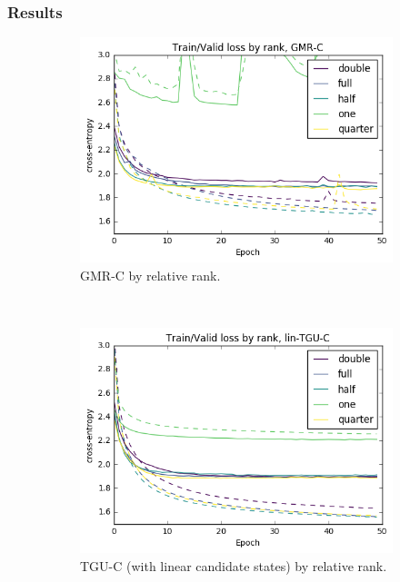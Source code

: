 \subsubsection{Results}
\begin{figure}
\centering
\begin{subfigure}[t]{0.3\textwidth}
	\centering
	\includegraphics[width=\textwidth]{exps/wp/gmr}
	\caption{GMR-C by relative rank.}
\end{subfigure}~
\begin{subfigure}[t]{0.3\textwidth}
	\centering
	\includegraphics[width=\textwidth]{exps/wp/lintgu}
	\caption{TGU-C (with linear candidate states) by relative rank.}
\end{subfigure}~
\begin{subfigure}[t]{0.3\textwidth}

\end{subfigure}
\end{figure}
